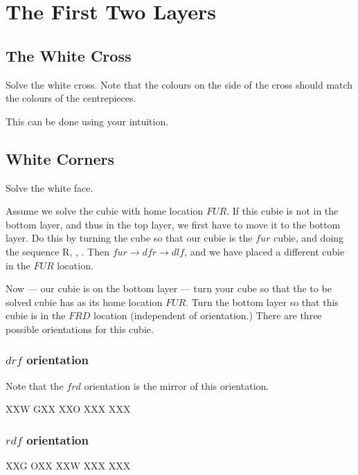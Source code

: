 \section{The First Two Layers}

\subsection{The White Cross}

\begin{goal}
    Solve the white cross.
    Note that the colours on the side of the cross should match the colours of the centrepieces.
\end{goal}
This can be done using your intuition.

\subsection{White Corners}

\begin{goal}
    Solve the white face.
\end{goal}

Assume we solve the cubie with home location $FUR$.
If this cubie is not in the bottom layer, and thus in the top layer, we first have to move it to the bottom layer.
Do this by turning the cube so that our cubie is the $fur$ cubie, and doing the sequence \textRubik R, , .
Then $fur \to dfr \to dlf$, and we have placed a different cubie in the $FUR$ location.

Now --- our cubie is on the bottom layer --- turn your cube so that the to be solved cubie has as its home location $FUR$.
Turn the bottom layer so that this cubie is in the $FRD$ location (independent of orientation.)
There are three possible orientations for this cubie.

\subsubsection{$drf$ orientation}
Note that the $frd$ orientation is the mirror of this orientation.

\RubikSliceBottomR XXW GXX
\RubikFaceDown XXO XXX XXX

\notextcube

\subsubsection{$rdf$ orientation}

\RubikSliceBottomR XXG OXX
\RubikFaceDown XXW XXX XXX

